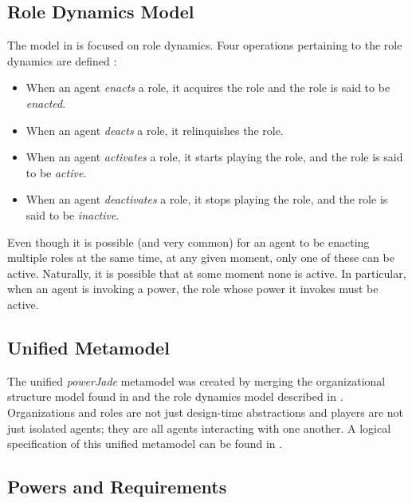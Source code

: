 \subsection*{Role Dynamics Model}

The model in \cite{Dastani04} is focused on role dynamics.
Four operations pertaining to the role dynamics are defined \cite{Dastani04}:
\begin{itemize}
	\item When an agent \textit{enacts} a role, it acquires the role and the role is said to be \textit{enacted}.
	\item When an agent \textit{deacts} a role, it relinquishes the role.
	\item When an agent \textit{activates} a role, it starts playing the role, and the role is said to be \textit{active}.
	\item When an agent \textit{deactivates} a role, it stops playing the role, and the role is said to be \textit{inactive}.
\end{itemize}

Even though it is possible (and very common) for an agent to be enacting multiple roles at the same time, at any given moment, only one of these can be active.
Naturally, it is possible that at some moment none is active.
In particular, when an agent is invoking a power, the role whose power it invokes must be active.

\subsection*{Unified Metamodel}

The unified \textit{powerJade} metamodel was created by merging the organizational structure model found in \cite{Boella04} and the role dynamics model described in \cite{Dastani04}.
Organizations and roles are not just design-time abstractions and players are not just isolated agents; they are all agents interacting with one another.
A logical specification of this unified metamodel can be found in \cite{Boella07}.

\subsection*{Powers and Requirements}

